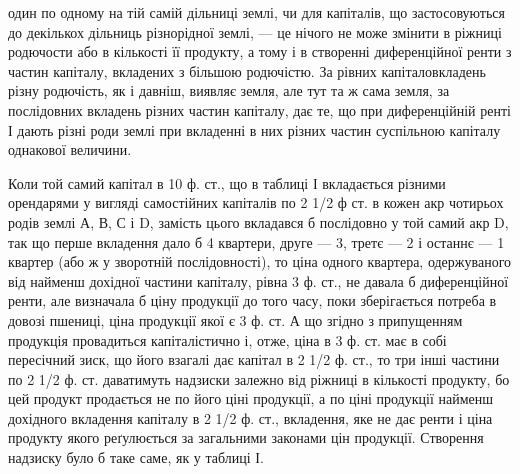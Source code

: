 \parcont{}  %
один по одному на тій самій дільниці землі, чи для капіталів, що застосовуються
до декількох дільниць різнорідної землі, — це нічого не може змінити в ріжниці
родючости або в кількості її продукту, а тому і в створенні диференційної
ренти з частин капіталу, вкладених з більшою родючістю. За рівних капіталовкладень
різну родючість, як і давніш, виявляє земля, але тут та ж сама земля,
за послідовних вкладень різних частин капіталу, дає те, що при диференційній
ренті І дають різні роди землі при вкладенні в них різних частин суспільною
капіталу однакової величини.

Коли той самий капітал в 10 ф. ст., що в таблиці І вкладається різними орендарями
у вигляді самостійних капіталів по 2 1/2 ф ст. в кожен акр чотирьох родів
землі А, В, С і D, замість цього вкладався б послідовно у той самий акр
D, так що перше вкладення дало б 4 квартери, друге — 3, третє — 2 і останнє
— 1 квартер (або ж у зворотній послідовності), то ціна одного квартера, одержуваного
від найменш дохідної частини капіталу, рівна 3 ф. ст., не давала б диференційної
ренти, але визначала б ціну продукції до того часу, поки зберігається
потреба в довозі пшениці, ціна продукції якої є 3 ф. ст. А що згідно з припущенням
продукція провадиться капіталістично і, отже, ціна в 3 ф. ст. має
в собі пересічний зиск, що його взагалі дає капітал в 2 1/2 ф. ст., то три інші
частини по 2 1/2 ф. ст. даватимуть надзиски залежно від ріжниці в кількості
продукту, бо цей продукт продається не по його ціні продукції, а по ціні продукції
найменш дохідного вкладення капіталу в 2 1/2 ф. ст., вкладення, яке не дає ренти
і ціна продукту якого реґулюється за загальними законами цін продукції. Створення
надзиску було б таке саме, як у таблиці І.

